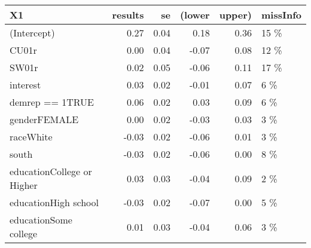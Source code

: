 \begin{table}[H]
\centering
\begin{tabular}{lrrrrl}
\toprule
X1 & results & se & (lower & upper) & missInfo\\
\midrule
(Intercept) & 0.27 & 0.04 & 0.18 & 0.36 & 15 \%\\
CU01r & 0.00 & 0.04 & -0.07 & 0.08 & 12 \%\\
SW01r & 0.02 & 0.05 & -0.06 & 0.11 & 17 \%\\
interest & 0.03 & 0.02 & -0.01 & 0.07 & 6 \%\\
demrep == 1TRUE & 0.06 & 0.02 & 0.03 & 0.09 & 6 \%\\
\addlinespace
genderFEMALE & 0.00 & 0.02 & -0.03 & 0.03 & 3 \%\\
raceWhite & -0.03 & 0.02 & -0.06 & 0.01 & 3 \%\\
south & -0.03 & 0.02 & -0.06 & 0.00 & 8 \%\\
educationCollege or Higher & 0.03 & 0.03 & -0.04 & 0.09 & 2 \%\\
educationHigh school & -0.03 & 0.02 & -0.07 & 0.00 & 5 \%\\
\addlinespace
educationSome college & 0.01 & 0.03 & -0.04 & 0.06 & 3 \%\\
\bottomrule
\end{tabular}
\end{table}